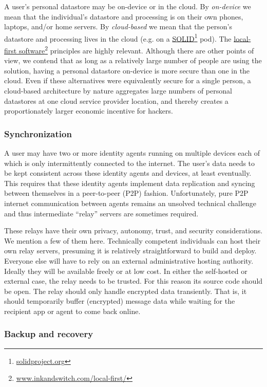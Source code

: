 \documentclass[11pt, oneside]{article}   	%
\newcommand{\hyperfootnote}[1][]{\def\ArgI{{#1}}\hyperfootnoteRelay}
\newcommand\hyperfootnoteRelay[2][]{\href{#1#2}{\ArgI}\footnote{\href{#1#2}{#2}}}
\begin{document}
A user's personal datastore may be on-device or in the cloud. By \emph{on-device} we mean that the individual's datastore and processing is on their own phones, laptops, and/or home servers. By \emph{cloud-based} we mean that the person's datastore and processing lives in the cloud (e.g. on a \hyperfootnote[SOLID][https://]{solidproject.org} pod). The \hyperfootnote[local-first software][https://]{www.inkandswitch.com/local-first/} principles are highly relevant. Although there are other points of view, we contend that as long as a relatively large number of people are using the solution, having a personal datastore on-device is more secure than one in the cloud. Even if these alternatives were equivalently secure for a single person, a cloud-based architecture by nature aggregates large numbers of personal datastores at one cloud service provider location, and thereby creates a proportionately larger economic incentive for hackers. 

\subsubsection{Synchronization}

A user may have two or more identity agents running on multiple devices each of which is only intermittently connected to the internet. The user's data needs to be kept consistent across these identity agents and devices, at least eventually. This requires that these identity agents implement data replication and syncing between themselves in a peer-to-peer (P2P) fashion. Unfortunately, pure P2P internet communication between agents remains an unsolved technical challenge and thus intermediate ``relay'' servers are sometimes required. 

These relays have their own privacy, autonomy, trust, and security considerations. We mention a few of them here.  Technically competent individuals can host their own relay servers, presuming it is relatively straightforward to build and deploy. Everyone else will have to rely on an external administrative hosting authority. Ideally they will be available freely or at low cost. In either the self-hosted or external case, the relay needs to be trusted. For this reason its source code should be open. The relay should only handle encrypted data transiently. That is, it should temporarily buffer (encrypted) message data while waiting for the recipient app or agent to come back online.

\subsubsection{Backup and recovery} 
\end{document}
